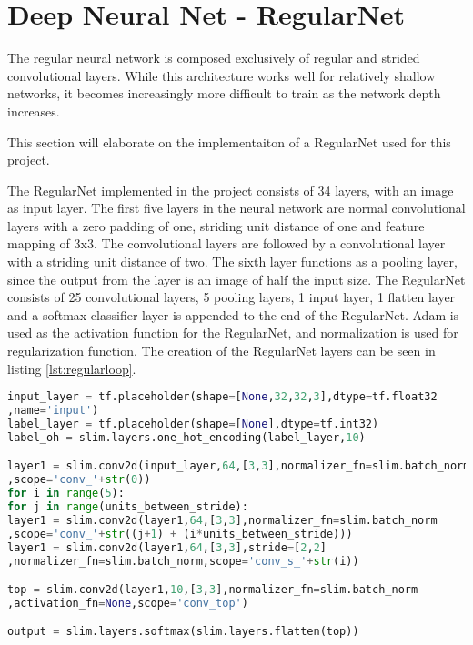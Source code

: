 \section{Deep Neural Net - RegularNet}
The regular neural network is composed exclusively of regular and strided convolutional layers. While this architecture works well for relatively shallow networks, it becomes increasingly more difficult to train as the network depth increases.

This section will elaborate on the implementaiton of a RegularNet used for this project.

The RegularNet implemented in the project consists of 34 layers, with an image as input layer. The first five layers in the neural network are normal convolutional layers with a zero padding of one, striding unit distance of one and feature mapping of 3x3. The convolutional layers are followed by a convolutional layer with a striding unit distance of two. The sixth layer functions as a pooling layer, since the output from the layer is an image of half the input size. The RegularNet consists of 25 convolutional layers, 5 pooling layers, 1 input layer, 1 flatten layer and a softmax classifier layer is appended to the end of the RegularNet. Adam is used as the activation function for the RegularNet, and normalization is used for regularization function. The creation of the RegularNet layers can be seen in listing \ref{lst:regularloop}.

\begin{lstlisting}[language=Python, label=lst:regularloop, caption=For loop that creates the layers in the RegularNet]
input_layer = tf.placeholder(shape=[None,32,32,3],dtype=tf.float32
,name='input')
label_layer = tf.placeholder(shape=[None],dtype=tf.int32)
label_oh = slim.layers.one_hot_encoding(label_layer,10)

layer1 = slim.conv2d(input_layer,64,[3,3],normalizer_fn=slim.batch_norm
,scope='conv_'+str(0))
for i in range(5):
for j in range(units_between_stride):
layer1 = slim.conv2d(layer1,64,[3,3],normalizer_fn=slim.batch_norm
,scope='conv_'+str((j+1) + (i*units_between_stride)))
layer1 = slim.conv2d(layer1,64,[3,3],stride=[2,2]
,normalizer_fn=slim.batch_norm,scope='conv_s_'+str(i))

top = slim.conv2d(layer1,10,[3,3],normalizer_fn=slim.batch_norm
,activation_fn=None,scope='conv_top')

output = slim.layers.softmax(slim.layers.flatten(top))
\end{lstlisting}

